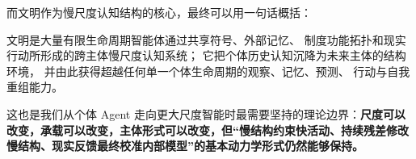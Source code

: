 \begin{statementbox}
\centering
{}
\end{statementbox}

而文明作为慢尺度认知结构的核心，最终可以用一句话概括：

\begin{conclusion}
文明是大量有限生命周期智能体通过共享符号、外部记忆、
制度功能拓扑和现实行动所形成的跨主体慢尺度认知系统；
它把个体历史认知沉降为未来主体的结构环境，
并由此获得超越任何单一个体生命周期的观察、记忆、预测、
行动与自我重组能力。
\end{conclusion}

这也是我们从个体 Agent 走向更大尺度智能时最需要坚持的理论边界：\textbf{尺度可以改变，承载可以改变，主体形式可以改变，但“慢结构约束快活动、持续残差修改慢结构、现实反馈最终校准内部模型”的基本动力学形式仍然能够保持。}
